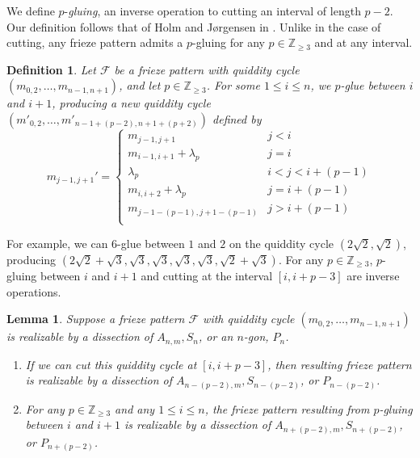 \documentclass[12pt]{article}
\newtheorem{definition}{Definition}
\newtheorem{lemma}{Lemma}
\theoremstyle{remark}
\newcommand*{\F}{\mathcal{F}}
\begin{document}
We define $p$-\emph{gluing}, an inverse operation to cutting an interval of length $p-2$. Our definition follows that of Holm and J{\o}rgensen in \cite{14}. Unlike in the case of cutting, any frieze pattern admits a $p$-gluing for any $p \in \mathbb{Z}_{\geq 3}$ and at any interval. 

\begin{definition}\label{def:gluing}
Let $\F$ be a frieze pattern with quiddity cycle $(m_{0,2},\ldots,m_{n-1,n+1})$, and let $p \in \mathbb{Z}_{\geq 3}$. For some $1 \leq i \leq n$, we $p$-\emph{glue} between $i$ and $i+1$, producing a new quiddity cycle $(m'_{0,2},\ldots,m'_{n-1+(p-2),n+1+(p+2)})$ defined by \[
m_{j-1,j+1}' = \begin{cases}
m_{j-1,j+1} & j < i\\
m_{i-1,i+1} + \lambda_p & j = i\\
\lambda_p & i < j < i+(p-1)\\
m_{i,i+2} + \lambda_p & j = i+(p-1)\\
m_{j - 1 - (p-1), j+1 - (p-1)} & j > i + (p-1)\\
\end{cases}
\]
\end{definition}

For example, we can 6-glue between $1$ and $2$ on the quiddity cycle $(2\sqrt{2},\sqrt{2})$, producing $(2\sqrt{2} + \sqrt{3}, \sqrt{3}, \sqrt{3}, \sqrt{3}, \sqrt{3}, \sqrt{2} + \sqrt{3})$.
For any $p \in \mathbb{Z}_{\geq 3}$, $p$-gluing between $i$ and $i+1$ and cutting at the interval $[i,i+p-3]$ are inverse operations. 

\begin{lemma}\label{lem:CutRealizable}
Suppose a frieze pattern $\mathcal{F}$ with quiddity cycle $(m_{0,2},\ldots,m_{n-1,n+1})$ is realizable by a dissection of $A_{n,m}, S_n$, or an $n$-gon, $P_n$. 
\begin{enumerate}
    \item If we can cut this quiddity cycle at $[i,i+p-3]$, then resulting frieze pattern is realizable by a dissection of $A_{n-(p-2),m}, S_{n-(p-2)}$, or $P_{n-(p-2)}$. 
    \item For any $p \in \mathbb{Z}_{\geq 3}$ and any $1 \leq i \leq n$, the frieze pattern resulting from  $p$-gluing between $i$ and $i+1$ is realizable by a dissection of $A_{n+(p-2),m}, S_{n+(p-2)}$, or $P_{n+(p-2)}$. 
\end{enumerate}
\end{lemma}
\end{document}
